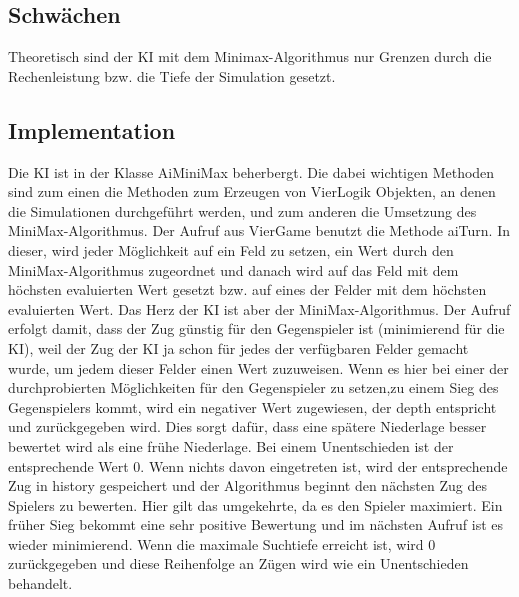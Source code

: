 \documentclass[12pt,a4paper,ngerman]{article}
\begin{document}
	
	
	\subsection{Schwächen}
	Theoretisch sind der KI mit dem Minimax-Algorithmus nur Grenzen durch die Rechenleistung bzw. die Tiefe der Simulation gesetzt.
	
	\subsection{Implementation}
	Die KI ist in der Klasse AiMiniMax beherbergt. Die dabei wichtigen Methoden sind zum einen die Methoden zum Erzeugen von VierLogik Objekten, an denen die Simulationen durchgeführt werden, und zum anderen die Umsetzung des MiniMax-Algorithmus. Der Aufruf aus VierGame benutzt die Methode aiTurn. In dieser, wird jeder Möglichkeit auf ein Feld zu setzen, ein Wert durch den MiniMax-Algorithmus zugeordnet und danach wird auf das Feld mit dem höchsten evaluierten Wert gesetzt bzw. auf eines der Felder mit dem höchsten evaluierten Wert. Das Herz der KI ist aber der MiniMax-Algorithmus. Der Aufruf erfolgt damit, dass der Zug günstig für den Gegenspieler ist (minimierend für die KI), weil der Zug der KI ja schon für jedes der verfügbaren Felder gemacht wurde, um jedem dieser Felder einen Wert zuzuweisen. Wenn es hier bei einer der durchprobierten Möglichkeiten für den Gegenspieler zu setzen,zu einem Sieg des Gegenspielers kommt, wird ein negativer Wert zugewiesen, der depth entspricht und zurückgegeben wird. Dies sorgt dafür, dass eine spätere Niederlage besser bewertet wird als eine frühe Niederlage.  Bei einem Unentschieden ist der entsprechende Wert 0. Wenn nichts davon eingetreten ist, wird der entsprechende Zug in history gespeichert und der Algorithmus beginnt den nächsten Zug des Spielers zu bewerten. Hier gilt das umgekehrte, da es den Spieler maximiert. Ein früher Sieg bekommt eine sehr positive Bewertung
	 und im nächsten Aufruf ist es wieder minimierend. Wenn die maximale Suchtiefe erreicht ist, wird 0 zurückgegeben und diese Reihenfolge an Zügen wird wie ein Unentschieden behandelt.
	
\end{document}
